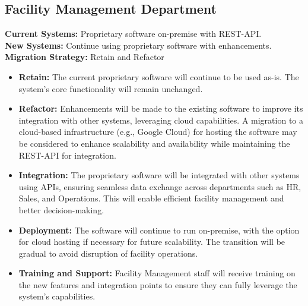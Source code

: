 \subsection{Facility Management Department}
\textbf{Current Systems:} Proprietary software on-premise with REST-API. \\
\textbf{New Systems:} Continue using proprietary software with enhancements. \\
\textbf{Migration Strategy:} Retain and Refactor
\begin{itemize}
    \item \textbf{Retain:} The current proprietary software will continue to be used as-is. The system's core functionality will remain unchanged.
    \item \textbf{Refactor:} Enhancements will be made to the existing software to improve its integration with other systems, leveraging cloud capabilities. A migration to a cloud-based infrastructure (e.g., Google Cloud) for hosting the software may be considered to enhance scalability and availability while maintaining the REST-API for integration.
    \item \textbf{Integration:} The proprietary software will be integrated with other systems using APIs, ensuring seamless data exchange across departments such as HR, Sales, and Operations. This will enable efficient facility management and better decision-making.
    \item \textbf{Deployment:} The software will continue to run on-premise, with the option for cloud hosting if necessary for future scalability. The transition will be gradual to avoid disruption of facility operations.
    \item \textbf{Training and Support:} Facility Management staff will receive training on the new features and integration points to ensure they can fully leverage the system’s capabilities.
\end{itemize}


